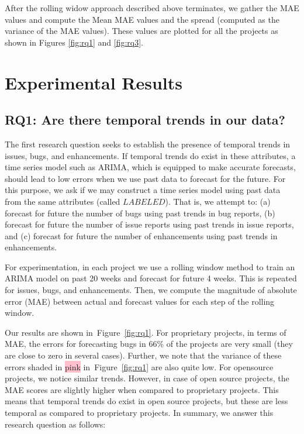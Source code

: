 \documentclass[sigconf, preprint]{acmart}
\newcommand{\fig}[1]{Figure~\ref{fig:#1}}
\begin{document}
After the rolling widow approach described above terminates, we gather the MAE 
values and compute the Mean MAE values and the spread 
(computed as the variance of the MAE values). These values are 
plotted for all the projects as shown in Figures \ref{fig:rq1} and \ref{fig:rq3}.


\section{Experimental Results}
\label{sect:results}
\subsection*{\normalsize{RQ1: Are there temporal trends in our data?}}
				
				
		The first research question seeks to establish the presence of temporal 
		trends in issues, bugs, and enhancements. If temporal trends do exist in 
		these attributes, a time series model such as ARIMA, which is equipped to 
		make accurate forecasts, should lead to low errors when we use past data to 
		forecast for the future. For this purpose, we ask if we may construct a 
		time series model using past data from the same attributes (called 
		$\mathit{LABELED}$). That is, we attempt 
		to: (a) forecast for future the number of bugs using past trends in bug 
		reports, (b) forecast for future the number of issue reports using past 
		trends in issue reports, and (c) forecast for future the number of 
		enhancements using past trends in enhancements.
			
		For experimentation, in each project we use a rolling window 
		method to train an ARIMA model on past 20 weeks and forecast for future 4 
		weeks. This is repeated for issues, bugs, and enhancements. Then, we 
		compute the magnitude of absolute error (MAE) between actual and forecast 
		values for each step of the rolling window.
		
		Our results are shown in~\fig{rq1}. For proprietary projects, in terms of 
		MAE, the errors for forecasting bugs in 66\% of the 
		projects are very small (they are close to zero in several cases). Further, we note that 
		the variance of these errors shaded in \colorbox{pink}{pink} in~\fig{rq1}
		are also quite low. For opensource projects, we notice similar trends. However, in case of open source projects, the MAE 
		scores are slightly higher when compared to proprietary projects. This means 
		that temporal trends do exist in open source projects, but these are less 
		temporal as compared to proprietary projects. In summary, we answer this 
		research question as follows:\\[-0.1cm]
		
\end{document}
